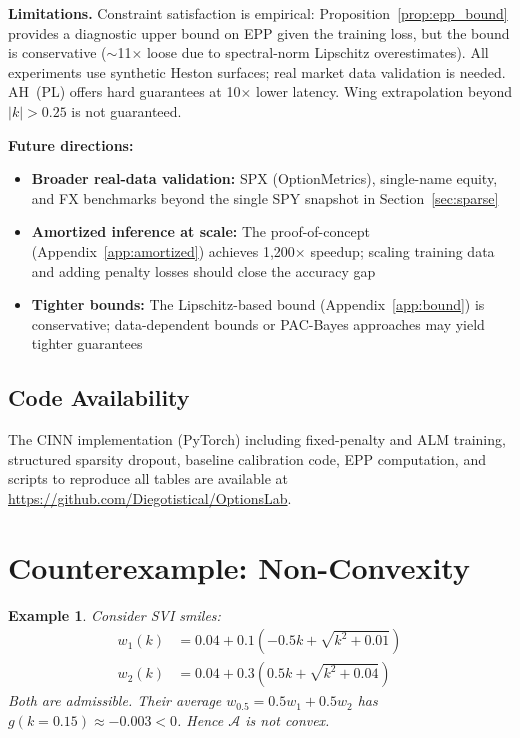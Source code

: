\documentclass[11pt,a4paper]{article}
\newtheorem{example}[theorem]{Example}
\begin{document}
\textbf{Limitations.} Constraint satisfaction is empirical: Proposition~\ref{prop:epp_bound} provides a diagnostic upper bound on EPP given the training loss, but the bound is conservative (${\sim}$11$\times$ loose due to spectral-norm Lipschitz overestimates). All experiments use synthetic Heston surfaces; real market data validation is needed. AH~(PL) offers hard guarantees at 10$\times$ lower latency. Wing extrapolation beyond $|k| > 0.25$ is not guaranteed.

\textbf{Future directions:}
\begin{itemize}
    \item \textbf{Broader real-data validation:} SPX (OptionMetrics), single-name equity, and FX benchmarks beyond the single SPY snapshot in Section~\ref{sec:sparse}
    \item \textbf{Amortized inference at scale:} The proof-of-concept (Appendix~\ref{app:amortized}) achieves 1,200$\times$ speedup; scaling training data and adding penalty losses should close the accuracy gap
    \item \textbf{Tighter bounds:} The Lipschitz-based bound (Appendix~\ref{app:bound}) is conservative; data-dependent bounds or PAC-Bayes approaches may yield tighter guarantees
\end{itemize}

\subsection*{Code Availability}

The CINN implementation (PyTorch) including fixed-penalty and ALM training, structured sparsity dropout, baseline calibration code, EPP computation, and scripts to reproduce all tables are available at \url{https://github.com/Diegotistical/OptionsLab}.


\appendix

\section{Counterexample: Non-Convexity}
\label{app:counterexample}

\begin{example}
Consider SVI smiles:
\begin{align}
    w_1(k) &= 0.04 + 0.1\left(-0.5k + \sqrt{k^2 + 0.01}\right) \\
    w_2(k) &= 0.04 + 0.3\left(0.5k + \sqrt{k^2 + 0.04}\right)
\end{align}
Both are admissible. Their average $w_{0.5} = 0.5 w_1 + 0.5 w_2$ has $g(k = 0.15) \approx -0.003 < 0$. Hence $\mathcal{A}$ is not convex.
\end{example}
\end{document}
